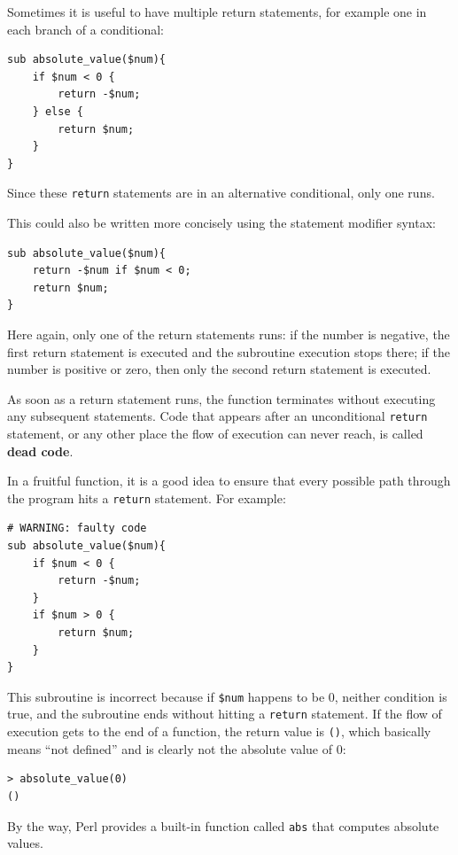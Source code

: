 Sometimes it is useful to have multiple return statements, for 
example one in each branch of a conditional:

\begin{verbatim}
sub absolute_value($num){
    if $num < 0 {
        return -$num;
    } else {
        return $num;
    }
}
\end{verbatim}
%
Since these {\tt return} statements are in an alternative 
conditional, only one runs.

This could also be written more concisely using the statement 
modifier syntax:

\begin{verbatim}
sub absolute_value($num){
    return -$num if $num < 0;
    return $num;
}
\end{verbatim}
%
Here again, only one of the return statements runs: if the 
number is negative, the first return statement is executed and 
the subroutine execution stops there; if the number is 
positive or zero, then only the second return statement is 
executed. 

As soon as a return statement runs, the function
terminates without executing any subsequent statements.
Code that appears after an unconditional {\tt return} statement, 
or any other place the flow of execution can never reach, 
is called {\bf dead code}.

In a fruitful function, it is a good idea to ensure
that every possible path through the program hits a
{\tt return} statement.  For example:

\begin{verbatim}
# WARNING: faulty code
sub absolute_value($num){
    if $num < 0 {
        return -$num;
    } 
    if $num > 0 {
        return $num;
    }
}
\end{verbatim}
%


This subroutine is incorrect because if {\tt \$num} happens to be 0,
neither condition is true, and the subroutine ends without hitting a
{\tt return} statement.  If the flow of execution gets to the end
of a function, the return value is {\tt ()}, which basically 
means ``not defined'' and is clearly not the absolute value of 0:

\begin{verbatim}
> absolute_value(0)
()
\end{verbatim}
%
By the way, Perl provides a built-in function called 
{\tt abs} that computes absolute values.

